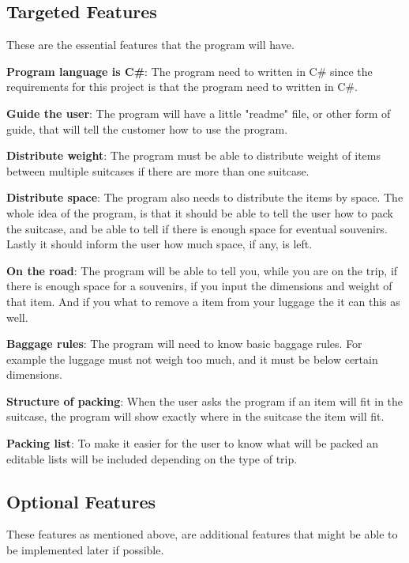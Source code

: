 \subsection{Targeted Features}
These are the essential features that the program will have.\newline

\textbf{Program language is C\#}:
The program need to written in C\# since the requirements for this project is that the program need to written in C\#.

\textbf{Guide the user}:
The program will have a little "readme" file, or other form of guide, that will tell the customer how to use the program.
\newline

\textbf{Distribute weight}:
The program must be able to distribute weight of items between multiple suitcases if there are more than one suitcase.
\newline

\textbf{Distribute space}:
The program also needs to distribute the items by space. The whole idea of the program, is that it should be able to tell the user how to pack the suitcase, and be able to tell if there is enough space for eventual souvenirs. Lastly it should inform the user how much space, if any, is left.
\newline

\textbf{On the road}:
The program will be able to tell you, while you are on the trip, if there is enough space for a souvenirs, if you input the dimensions and weight of that item. And if you what to remove a item from your luggage the it can this as well.
\newline

\textbf{Baggage rules}:
The program will need to know basic baggage rules. For example the luggage must not weigh too much, and it must be below certain dimensions.
\newline

\textbf{Structure of packing}:
When the user asks the program if an item will fit in the suitcase, the program will show exactly where in the suitcase the item will fit.
\newline

\textbf{Packing list}:
To make it easier for the user to know what will be packed an editable lists will be included depending on the type of trip.
\newline

\subsection{Optional Features}
These features as mentioned above, are additional features that might be able to be implemented later if possible.\newline

